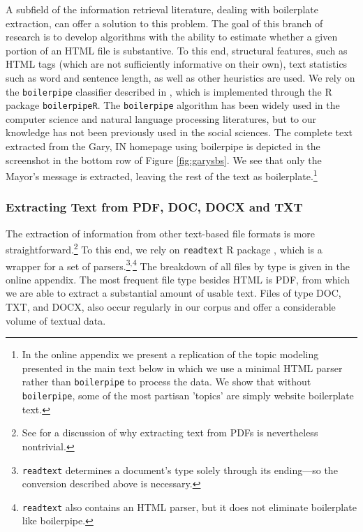 \documentclass[11pt]{article}
\begin{document}
A subfield of the information retrieval literature, dealing with boilerplate extraction, can offer a solution to this problem. The goal of this branch of research is to develop algorithms with the ability to estimate whether a given portion of an HTML file is substantive. To this end, structural features, such as HTML tags (which are not sufficiently informative on their own), text statistics such as word and sentence length, as well as other heuristics are used. We rely on the \texttt{boilerpipe} classifier described in \cite{Kohlschutter2010}, which is implemented through the R package \texttt{boilerpipeR}. The \texttt{boilerpipe} algorithm has been widely used in the computer science and natural language processing literatures, but to our knowledge has not been previously used in the social sciences.   The complete text extracted from the Gary, IN homepage using boilerpipe is depicted in the screenshot in the bottom row of Figure \ref{fig:garysbs}. We see that only the Mayor's message is extracted, leaving the rest of the text as boilerplate.\footnote{In the online appendix we present a replication of the topic modeling presented in the main text below in which we use a minimal HTML parser rather than \texttt{boilerpipe} to process the data. We show that without \texttt{boilerpipe}, some of the most partisan 'topics' are simply website boilerplate text. }

\subsubsection{Extracting Text from PDF, DOC, DOCX and TXT}
The extraction of information from other text-based file formats is more straightforward.\footnote{See \cite{Berg2012} for a discussion of why extracting text from PDFs is nevertheless nontrivial.} To this end, we rely on \texttt{readtext} R package \citep{readtext}, which is a wrapper for a set of parsers.\footnote{\texttt{readtext} determines a document's type solely through its ending---so the conversion described above is necessary.}$^{,}$\footnote{\texttt{readtext} also contains an HTML parser, but it does not eliminate boilerplate like boilerpipe.} The breakdown of all files by type is given in the online appendix. The most frequent file type besides HTML is PDF, from which we are able to extract a substantial amount of usable text. Files of type DOC, TXT, and DOCX, also occur regularly in our corpus and offer a considerable volume of textual data.
\end{document}

